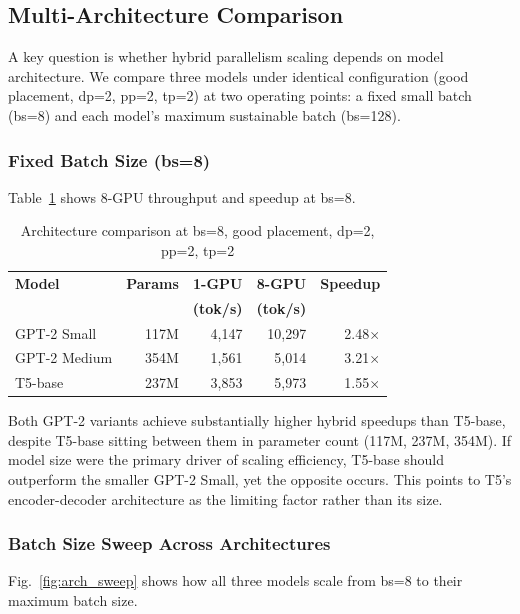 \documentclass[conference]{IEEEtran}
\begin{document}
\subsection{Multi-Architecture Comparison}

A key question is whether hybrid parallelism scaling depends on model architecture. We compare three models under identical configuration (good placement, dp=2, pp=2, tp=2) at two operating points: a fixed small batch (bs=8) and each model's maximum sustainable batch (bs=128).

\subsubsection{Fixed Batch Size (bs=8)}

Table~\ref{tab:arch_bs8} shows 8-GPU throughput and speedup at bs=8.

\begin{table}[h]
\centering
\caption{Architecture comparison at bs=8, good placement, dp=2, pp=2, tp=2}
\label{tab:arch_bs8}
\small
\begin{tabular}{lrrrr}
\toprule
\textbf{Model} & \textbf{Params} & \textbf{1-GPU} & \textbf{8-GPU} & \textbf{Speedup} \\
 & & \textbf{(tok/s)} & \textbf{(tok/s)} & \\
\midrule
GPT-2 Small & 117M & 4,147 & 10,297 & 2.48$\times$ \\
GPT-2 Medium & 354M & 1,561 & 5,014 & 3.21$\times$ \\
T5-base & 237M & 3,853 & 5,973 & 1.55$\times$ \\
\bottomrule
\end{tabular}
\end{table}

Both GPT-2 variants achieve substantially higher hybrid speedups than T5-base, despite T5-base sitting between them in parameter count (117M, 237M, 354M). If model size were the primary driver of scaling efficiency, T5-base should outperform the smaller GPT-2 Small, yet the opposite occurs. This points to T5's encoder-decoder architecture as the limiting factor rather than its size.

\subsubsection{Batch Size Sweep Across Architectures}

Fig.~\ref{fig:arch_sweep} shows how all three models scale from bs=8 to their maximum batch size.
\end{document}
